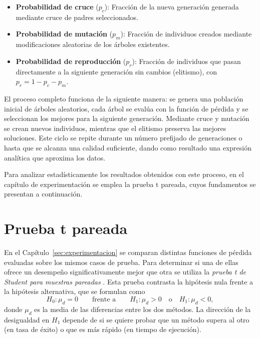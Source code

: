 \begin{itemize}
    \item \textbf{Probabilidad de cruce} (\(p_c\)): Fracción de la nueva generación generada mediante cruce de padres seleccionados.

    \item \textbf{Probabilidad de mutación} (\(p_m\)): Fracción de individuos creados mediante modificaciones aleatorias de los árboles existentes.

    \item \textbf{Probabilidad de reproducción} (\(p_r\)): Fracción de individuos que pasan directamente a la siguiente generación sin cambios (elitismo), con \(p_r = 1 - p_c - p_m\).
\end{itemize}

El proceso completo funciona de la siguiente manera: se genera una población inicial de árboles aleatorios, cada árbol se evalúa con la función de pérdida y se seleccionan los mejores para la siguiente generación. Mediante cruce y mutación se crean nuevos individuos, mientras que el elitismo preserva las mejores soluciones. Este ciclo se repite durante un número prefijado de generaciones o hasta que se alcanza una calidad suficiente, dando como resultado una expresión analítica que aproxima los datos.

Para analizar estadísticamente los resultados obtenidos con este proceso, en el capítulo de experimentación se emplea la prueba t pareada, cuyos fundamentos se presentan a continuación.

\section{Prueba t pareada}
\label{sec:prueba_t}

En el Capítulo~\ref{sec:experimentacion} se comparan distintas funciones de pérdida evaluadas sobre los mismos casos de prueba. Para determinar si una de ellas ofrece un desempeño significativamente mejor que otra se utiliza la \textit{prueba t de Student para muestras pareadas} \cite{montgomery2017applied}. Esta prueba contrasta la hipótesis nula frente a la hipótesis alternativa, que se formulan como
\[
H_0 : \mu_d = 0 \qquad\text{frente a}\qquad H_1 : \mu_d > 0 \quad\text{o}\quad H_1 : \mu_d < 0,
\]
donde \(\mu_d\) es la media de las diferencias entre los dos métodos. La dirección de la desigualdad en \(H_1\) depende de si se quiere probar que un método supera al otro (en tasa de éxito) o que es más rápido (en tiempo de ejecución).

